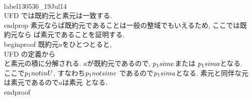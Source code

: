  \\label{130536_19Jul14}
 \\UFD では既約元と素元は一致する.
\\end{prop}
素元ならば既約元であることは一般の整域でもいえるため, ここでは既約元なら
ば素元であることを証明する.
\\begin{proof}
 既約元$a$をひとつとると, \\UFD の定義から
 \\[
  a=p_{1}p_{2}\\cdots p_{n}
 \\]
 と素元の積に分解される. $a$が既約元であるので, $p_{1}\\sim e$または
 $p_{1}\\sim a$となる. ここで$p_{1}\\not\\in U$, すなわち$p_{1}\\not\\sim e$
 であるので$p_{1}\\sim a$となる. 素元と同伴な元は素元であるので$a$は素元
 となる.
\\end{proof}



